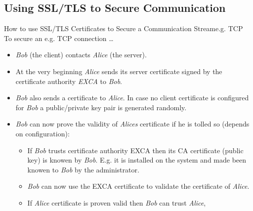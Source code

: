 ﻿\subsection{Using SSL/TLS to Secure Communication}

\begin{frame}{How to use SSL/TLS Certificates to Secure a Communication Stream}{e.g. TCP}
    To secure an e.g. TCP connection \ldots
    \begin{itemize}
        \item \alert{\textit{Bob}} (the client) contacts \alert{\textit{Alice}} (the server).
        \item  At the very beginning \alert{\textit{Alice}} sends its \alert{server certificate} signed by the \alert{certificate authority \textit{EXCA}} to \textit{Bob}.
        \item \alert{\textit{Bob} also sends a certificate} to \textit{Alice}. In case no \alert{client} certificate is configured for \textit{Bob} a public/private key pair is generated randomly.
        \item \textit{Bob} can now \alert{prove} the \alert{validity} of \textit{Alices} \alert{certificate} if he is tolled so (depends on \alert{configuration}):
        \begin{itemize}
            \item If \textit{Bob} \alert{trusts} certificate authority \alert{EXCA} then its \alert{CA certificate (public key) is knowen} by \textit{Bob}. E.g. it is installed on the system and made been knowen to \textit{Bob} by the \alert{administrator}.
            \item \textit{Bob} can now \alert{use the EXCA certificate} to \alert{validate} the \alert{certificate of \textit{Alice}}.
            \item If \textit{Alice} certificate is \alert{proven valid} then \textit{Bob} \alert{can trust} \textit{Alice},
        \end{itemize}
    \end{itemize}
\end{frame}
